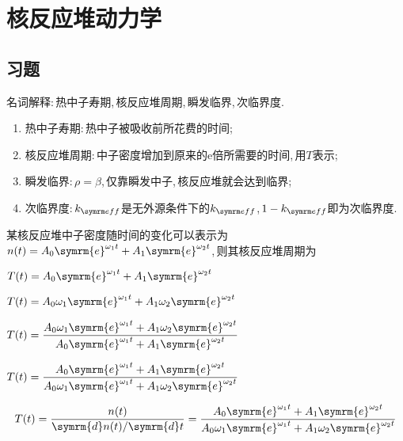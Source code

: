 \chapter{核反应堆动力学}
\section*{习题}

\begin{exercise}
    名词解释:\,热中子寿期,\,核反应堆周期,\,瞬发临界,\,次临界度.\,
    \begin{solution}
        \begin{enumerate}[(1)]
            \item 热中子寿期:\,热中子被吸收前所花费的时间;\,
            \item 核反应堆周期:\,中子密度增加到原来的e倍所需要的时间,\,用$T$表示;\,
            \item 瞬发临界:\,$\rho = \beta$,\,仅靠瞬发中子,\,核反应堆就会达到临界;\,
            \item 次临界度:\,$\keff$是无外源条件下的$\keff$,\,$1 - \keff$即为次临界度.\,
        \end{enumerate}
    \end{solution}
\end{exercise}

\begin{exercise}
    某核反应堆中子密度随时间的变化可以表示为$n(t) = A_0 \symrm{e}^{\omega_1 t} + A_1 \symrm{e}^{\omega_2 t}$,\,则其核反应堆周期为\xparen
    \begin{xchoices}[showanswer=true]
        \item $T(t) = A_0 \symrm{e}^{\omega_1 t} + A_1 \symrm{e}^{\omega_2 t}$
        \item $T(t) = A_0 \omega_1 \symrm{e}^{\omega_1 t} + A_1 \omega_2 \symrm{e}^{\omega_2 t}$
        \item $\displaystyle T(t) = \frac{A_0 \omega_1 \symrm{e}^{\omega_1 t} + A_1 \omega_2 \symrm{e}^{\omega_2 t}}{A_0 \symrm{e}^{\omega_1 t} + A_1 \symrm{e}^{\omega_2 t}}$
        \item* $\displaystyle T(t) = \frac{A_0 \symrm{e}^{\omega_1 t} + A_1 \symrm{e}^{\omega_2 t}}{A_0 \omega_1 \symrm{e}^{\omega_1 t} + A_1 \omega_2 \symrm{e}^{\omega_2 t}}$
    \end{xchoices}
    
    \vspace*{2em}
    
    \begin{solution}
        \begin{equation*}
            T(t) = \frac{n(t)}{\symrm{d}n(t)/\symrm{d}t} = \frac{A_0 \symrm{e}^{\omega_1 t} + A_1 \symrm{e}^{\omega_2 t}}{A_0 \omega_1 \symrm{e}^{\omega_1 t} + A_1 \omega_2 \symrm{e}^{\omega_2 t}}
        \end{equation*}
    \end{solution}
\end{exercise}

